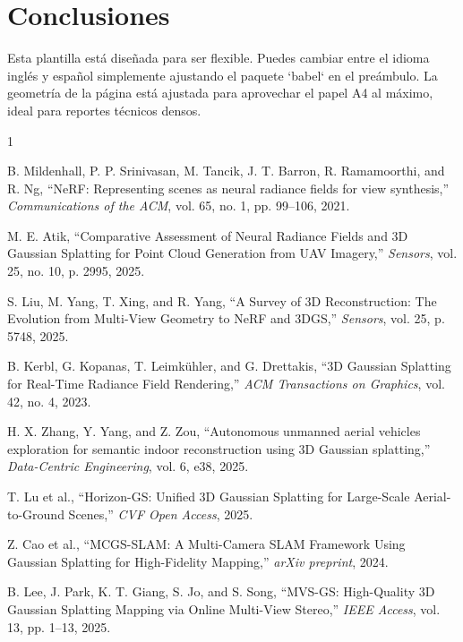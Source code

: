 \documentclass[12pt,a4paper]{article}
\begin{document}
	\section{Conclusiones}
	Esta plantilla está diseñada para ser flexible. Puedes cambiar entre el idioma inglés y español simplemente ajustando el paquete `babel` en el preámbulo. La geometría de la página está ajustada para aprovechar el papel A4 al máximo, ideal para reportes técnicos densos.
	
	
	
	\begin{thebibliography}{1}
		
		B. Mildenhall, P. P. Srinivasan, M. Tancik, J. T. Barron, R. Ramamoorthi, and R. Ng, ``NeRF: Representing scenes as neural radiance fields for view synthesis,'' \textit{Communications of the ACM}, vol. 65, no. 1, pp. 99--106, 2021.
		
		M. E. Atik, ``Comparative Assessment of Neural Radiance Fields and 3D Gaussian Splatting for Point Cloud Generation from UAV Imagery,'' \textit{Sensors}, vol. 25, no. 10, p. 2995, 2025.
		
		S. Liu, M. Yang, T. Xing, and R. Yang, ``A Survey of 3D Reconstruction: The Evolution from Multi-View Geometry to NeRF and 3DGS,'' \textit{Sensors}, vol. 25, p. 5748, 2025.
		
		B. Kerbl, G. Kopanas, T. Leimkühler, and G. Drettakis, ``3D Gaussian Splatting for Real-Time Radiance Field Rendering,'' \textit{ACM Transactions on Graphics}, vol. 42, no. 4, 2023.
		
		H. X. Zhang, Y. Yang, and Z. Zou, ``Autonomous unmanned aerial vehicles exploration for semantic indoor reconstruction using 3D Gaussian splatting,'' \textit{Data-Centric Engineering}, vol. 6, e38, 2025.
		
		T. Lu et al., ``Horizon-GS: Unified 3D Gaussian Splatting for Large-Scale Aerial-to-Ground Scenes,'' \textit{CVF Open Access}, 2025.
		
		Z. Cao et al., ``MCGS-SLAM: A Multi-Camera SLAM Framework Using Gaussian Splatting for High-Fidelity Mapping,'' \textit{arXiv preprint}, 2024.
		
		B. Lee, J. Park, K. T. Giang, S. Jo, and S. Song, ``MVS-GS: High-Quality 3D Gaussian Splatting Mapping via Online Multi-View Stereo,'' \textit{IEEE Access}, vol. 13, pp. 1--13, 2025.
		

\end{thebibliography}
\end{document}
